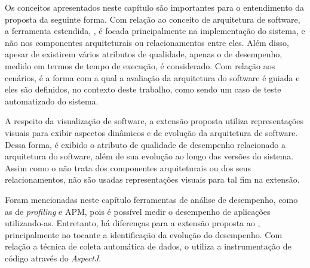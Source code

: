Os conceitos apresentados neste capítulo são importantes para o entendimento da proposta da seguinte forma. Com relação ao conceito de arquitetura de software, a ferramenta estendida, \textit{\perfMinerName}, é focada principalmente na implementação do sistema, e não nos componentes arquiteturais ou relacionamentos entre eles. Além disso, apesar de existirem vários atributos de qualidade, apenas o de desempenho, medido em termos de tempo de execução, é considerado. Com relação aos cenários, é a forma com a qual a avaliação da arquitetura do software é guiada e eles são definidos, no contexto deste trabalho, como sendo um caso de teste automatizado do sistema.

A respeito da visualização de software, a extensão proposta utiliza representações visuais para exibir aspectos dinâmicos e de evolução da arquitetura de software. Dessa forma, é exibido o atributo de qualidade de desempenho relacionado a arquitetura do software, além de sua evolução ao longo das versões do sistema. Assim como o \textit{\perfMinerName} não trata dos componentes arquiteturais ou dos seus relacionamentos, não são usadas representações visuais para tal fim na extensão.

Foram mencionadas neste capítulo ferramentas de análise de desempenho, como as de \textit{profiling} e APM, pois é possível medir o desempenho de aplicações utilizando-as. Entretanto, há diferenças para a extensão proposta ao \textit{\perfMinerName}, principalmente no tocante a identificação da evolução do desempenho. Com relação a técnica de coleta automática de dados, o \textit{\perfMinerName} utiliza a instrumentação de código através do \textit{AspectJ}.